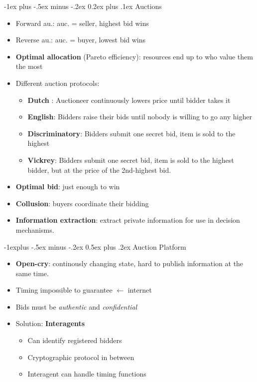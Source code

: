 \documentclass[10pt,a4paper,landscape]{article}
\makeatletter
\renewcommand{\section}{\@startsection{section}{1}{0mm}%
                                {-1ex plus -.5ex minus -.2ex}%
                                {0.2ex plus .1ex}%
                                {\normalfont\tiny\bfseries}}
\renewcommand{\subsection}{\@startsection{subsection}{2}{0mm}%
                                {-1explus -.5ex minus -.2ex}%
                                {0.5ex plus .2ex}%
                                {\normalfont\tiny\bfseries}}
\makeatother
\begin{document}
\begin{multicols*}{5}

\section{Auctions}
\begin{itemize}
	\item Forward au.: auc. = seller, highest bid wins
	\item Reverse au.: auc. = buyer, lowest bid wins
	\item \textbf{Optimal allocation} (Pareto efficiency): resources end up to who value them the most
	\item Different auction protocols:
	\begin{itemize}
		\item \textbf{Dutch} : Auctioneer continuously lowers price until bidder takes it
		\item \textbf{English}: Bidders raise their bids until nobody is willing to go any higher
		\item \textbf{Discriminatory}: Bidders submit one secret bid, item is sold to the highest
		\item \textbf{Vickrey}: Bidders submit one secret bid, item is sold to the highest bidder, but at the price of the 2nd-highest bid.
	\end{itemize}
	\item \textbf{Optimal bid}: just enough to win
	\item \textbf{Collusion}: buyers coordinate their bidding
	\item \textbf{Information extraction}: extract private information for use in decision mechanisms.
\end{itemize}

\subsection{Auction Platform}
\begin{itemize}
	\item \textbf{Open-cry}: continously changing state, hard to publish information at the same time.
	\item Timing impossible to guarantee $\leftarrow$ internet
	\item Bids must be \textit{authentic} and \textit{confidential}
	\item Solution: \textbf{Interagents}
	\begin{itemize}
		\item Can identify registered bidders  
		\item Cryptographic protocol in between
		\item Interagent can handle timing functions
	\end{itemize}
\end{itemize}

\end{multicols*}
\end{document}
